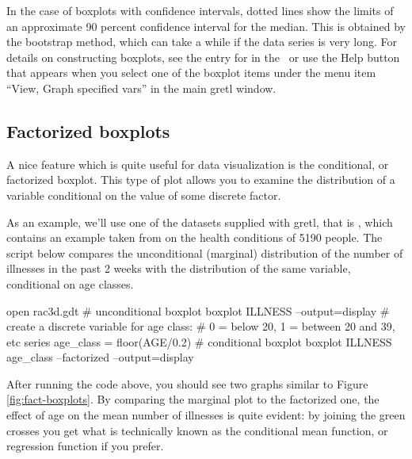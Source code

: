 In the case of boxplots with confidence intervals, dotted lines show
the limits of an approximate 90 percent confidence interval for the
median.  This is obtained by the bootstrap method, which can take a
while if the data series is very long. For details on constructing
boxplots, see the entry for  in the \GCR\, or use the
\textsf{Help} button that appears when you select one of the boxplot
items under the menu item ``View, Graph specified vars'' in the main
gretl window.

\subsection{Factorized boxplots}

A nice feature which is quite useful for data visualization is the
conditional, or factorized boxplot.  This type of plot allows you to
examine the distribution of a variable conditional on the value of
some discrete factor.

As an example, we'll use one of the datasets supplied with
gretl, that is , which contains an example taken from
\cite{cameron-trivedi13} on the health conditions of 5190 people. The
script below compares the unconditional (marginal) distribution of the
number of illnesses in the past 2 weeks with the distribution of the
same variable, conditional on age classes.

\begin{scode}
open rac3d.gdt
# unconditional boxplot
boxplot ILLNESS --output=display
# create a discrete variable for age class: 
# 0 = below 20, 1 = between 20 and 39, etc
series age_class = floor(AGE/0.2)
# conditional boxplot
boxplot ILLNESS age_class --factorized --output=display
\end{scode}

After running the code above, you should see two graphs similar to
Figure \ref{fig:fact-boxplots}. By comparing the marginal plot to
the factorized one, the effect of age on the mean number of illnesses
is quite evident: by joining the green crosses you get what is
technically known as the conditional mean function, or regression
function if you prefer.

